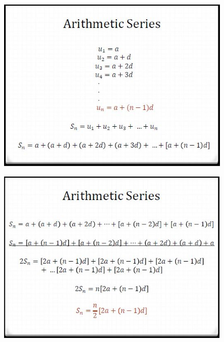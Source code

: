 \documentclass{beamer}
\begin{document}
\begin{frame}
	\begin{figure}
		\centering
		\includegraphics[width=0.99\linewidth]{SeqSer17A}
	\end{figure}
	
\end{frame}	
\begin{frame}
	\begin{figure}
		\centering
		\includegraphics[width=0.99\linewidth]{SeqSer17B}
	\end{figure}
	
\end{frame}
\end{document}
